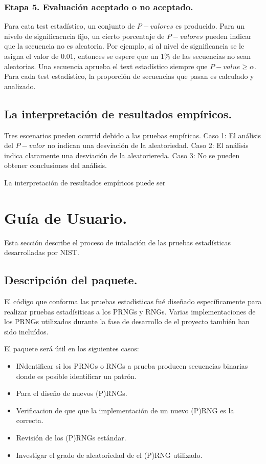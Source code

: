 \documentclass{llncs}
\theoremstyle{plane}
\begin{document}
\subsubsection{Etapa 5. Evaluación aceptado o no aceptado.}
Para cata test estadístico, un conjunto de $P-valores$ es producido. Para un nivelo de significacncia fijo, un cierto porcentaje de $P-valores$ pueden indicar que la secuencia no es aleatoria. Por ejemplo, si al nivel de significancia se le asigna el valor de $0.01$, entonces se espere que un $1\%$ de las secuencias no sean aleatorias. Una secuencia aprueba el text estadístico siempre que $P-value \geq \alpha$. Para cada test estadístico, la proporción de secuencias que pasan es calculado y analizado. 


\subsection{La interpretación de resultados empíricos.}

Tres escenarios pueden ocurrid debido a las pruebas empíricas. Caso 1: El análisis del $P-valor$ no indican una desviación de la aleatoriedad. Caso 2: El análisis indica claramente una desviación de la aleatoriereda. Caso 3: No se pueden obtener conclusiones del análisis.

La interpretación de resultados empíricos puede ser 


\section{Guía de Usuario.}
Esta sección describe el proceso de intalación de las pruebas estadísticas desarrolladas por NIST.

\subsection{Descripción del paquete.}
El código que conforma las pruebas estadísticas fué diseñado específicamente para realizar pruebas estadísiticas a los PRNGs y RNGs. Varias implementaciones de los PRNGs utilizados durante la fase de desarrollo de el proyecto también han sido incluídos.

El paquete será útil en los siguientes casos:
\begin{itemize}
\item INdentificar si los PRNGs o RNGs a prueba producen secuencias binarias donde es posible identificar un patrón.
\item Para el diseño de nuevos (P)RNGs.
\item Verificacion de que que la implementación de un nuevo (P)RNG es la correcta. 
\item Revisión de los (P)RNGs estándar. 
\item Investigar el grado de aleatoriedad de el (P)RNG utilizado.
\end{itemize}
\end{document}
